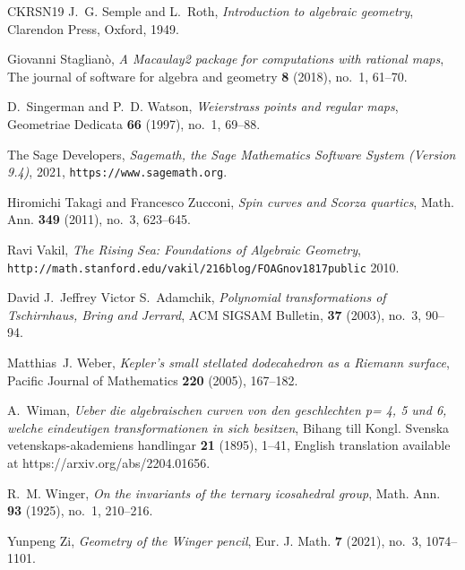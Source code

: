 \documentclass{amsart}
\begin{document}
\begin{thebibliography}{CKRSN19}
J.~G. Semple and L.~Roth, \emph{Introduction to algebraic geometry}, Clarendon
  Press, Oxford, 1949.

Giovanni Staglianò, \emph{A {M}acaulay2 package for computations with rational
  maps}, The journal of software for algebra and geometry \textbf{8} (2018),
  no.~1, 61--70.

D.~Singerman and P.~D. Watson, \emph{Weierstrass points and regular maps},
  Geometriae Dedicata \textbf{66} (1997), no.~1, 69--88.

{The Sage Developers}, \emph{{S}agemath, the {S}age {M}athematics {S}oftware
  {S}ystem ({V}ersion 9.4)}, 2021, {\tt https://www.sagemath.org}.

Hiromichi Takagi and Francesco Zucconi, \emph{Spin curves and {S}corza
  quartics}, Math. Ann. \textbf{349} (2011), no.~3, 623--645.

Ravi Vakil, \emph{{The Rising Sea: Foundations of Algebraic Geometry}},
  {\tt{http://math.stanford.edu/\texttildelow vakil/216blog/FOAGnov1817public}}
  2010.

David J.~Jeffrey Victor S.~Adamchik, \emph{Polynomial transformations of
  {T}schirnhaus, {B}ring and {J}errard}, ACM SIGSAM Bulletin, \textbf{37}
  (2003), no.~3, 90--94.

Matthias~J. Weber, \emph{Kepler's small stellated dodecahedron as a {R}iemann
  surface}, Pacific Journal of Mathematics \textbf{220} (2005), 167--182.

A.~Wiman, \emph{Ueber die algebraischen curven von den geschlechten p= 4, 5 und
  6, welche eindeutigen transformationen in sich besitzen}, Bihang till Kongl.
  Svenska vetenskaps-akademiens handlingar \textbf{21} (1895), 1--41, English
  translation available at https://arxiv.org/abs/2204.01656.

R.~M. Winger, \emph{On the invariants of the ternary icosahedral group}, Math.
  Ann. \textbf{93} (1925), no.~1, 210--216.

Yunpeng Zi, \emph{Geometry of the {W}inger pencil}, Eur. J. Math. \textbf{7}
  (2021), no.~3, 1074--1101.

\end{thebibliography}
\end{document}
